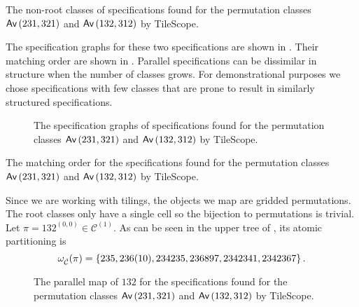 \begin{table}[ht!]
    \centering
    
    \caption{The non-root classes of specifications found for the permutation classes $\textsf{Av}\left(231,321\right)$ and $\textsf{Av}\left(132,312\right)$ by TileScope.}
    \label{tab:parmapex}
\end{table}

The specification graphs for these two specifications are shown in . Their matching order are shown in . Parallel specifications can be dissimilar in structure when the number of classes grows. For demonstrational purposes we chose specifications with few classes that are prone to result in similarly structured specifications.

\begin{figure}[ht!]
    \centering
    
    \caption{The specification graphs of specifications found for the permutation classes $\textsf{Av}\left(231,321\right)$ and $\textsf{Av}\left(132,312\right)$ by TileScope.}
    \label{fig:avexspecgraphs}
\end{figure}

\begin{table}[ht!]
    \centering
    
    \caption{The matching order for the specifications found for the permutation classes $\textsf{Av}\left(231,321\right)$ and $\textsf{Av}\left(132,312\right)$ by TileScope.}
    \label{tab:avexmatchingorder}
\end{table}

Since we are working with tilings, the objects we map are gridded permutations. The root classes only have a single cell so the bijection to permutations is trivial. Let $\pi=132^{(0,0)} \in \mathcal{C}^{(1)}$. As can be seen in the upper tree of , its atomic partitioning is 
\[
    \omega_{\check{\mathcal{C}}}(\pi) = \left\{235, 236(10), 234235,236897,2342341,2342367\right\}.
\]

\begin{figure}[!htbp]
    \centering
    
    \caption{The parallel map of $132$ for the specifications found for the permutation classes $\textsf{Av}\left(231,321\right)$ and $\textsf{Av}\left(132,312\right)$ by TileScope.}
    \label{fig:mapexap}
\end{figure}

